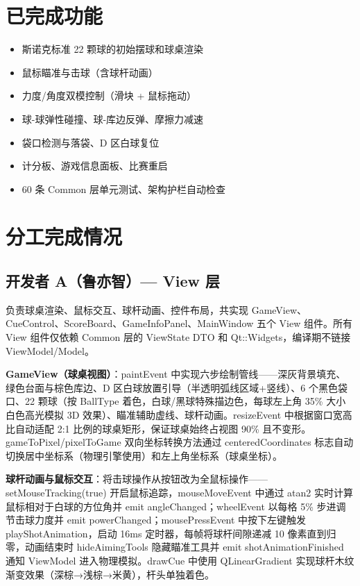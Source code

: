 \documentclass[11pt]{ctexart}
\begin{document}
\section{已完成功能}

\begin{itemize}
\item 斯诺克标准 22 颗球的初始摆球和球桌渲染
\item 鼠标瞄准与击球（含球杆动画）
\item 力度/角度双模控制（滑块 + 鼠标拖动）
\item 球-球弹性碰撞、球-库边反弹、摩擦力减速
\item 袋口检测与落袋、D 区白球复位
\item 计分板、游戏信息面板、比赛重启
\item 60 条 Common 层单元测试、架构护栏自动检查
\end{itemize}

\section{分工完成情况}

\subsection{开发者 A（鲁亦智）— View 层}

负责球桌渲染、鼠标交互、球杆动画、控件布局，共实现 GameView、CueControl、ScoreBoard、GameInfoPanel、MainWindow 五个 View 组件。所有 View 组件仅依赖 Common 层的 ViewState DTO 和 Qt::Widgets，编译期不链接 ViewModel/Model。

\textbf{GameView（球桌视图）}：paintEvent 中实现六步绘制管线——深灰背景填充、绿色台面与棕色库边、D 区白球放置引导（半透明弧线区域+竖线）、6 个黑色袋口、22 颗球（按 BallType 着色，白球/黑球特殊描边色，每球左上角 35\% 大小白色高光模拟 3D 效果）、瞄准辅助虚线、球杆动画。resizeEvent 中根据窗口宽高比自动适配 2:1 比例的球桌矩形，保证球桌始终占视图 90\% 且不变形。gameToPixel/pixelToGame 双向坐标转换方法通过 centeredCoordinates 标志自动切换居中坐标系（物理引擎使用）和左上角坐标系（球桌坐标）。

\textbf{球杆动画与鼠标交互}：将击球操作从按钮改为全鼠标操作——setMouseTracking(true) 开启鼠标追踪，mouseMoveEvent 中通过 atan2 实时计算鼠标相对于白球的方位角并 emit angleChanged；wheelEvent 以每格 5\% 步进调节击球力度并 emit powerChanged；mousePressEvent 中按下左键触发 playShotAnimation，启动 16ms 定时器，每帧将球杆间隙递减 10 像素直到归零，动画结束时 hideAimingTools 隐藏瞄准工具并 emit shotAnimationFinished 通知 ViewModel 进入物理模拟。drawCue 中使用 QLinearGradient 实现球杆木纹渐变效果（深棕→浅棕→米黄），杆头单独着色。
\end{document}

